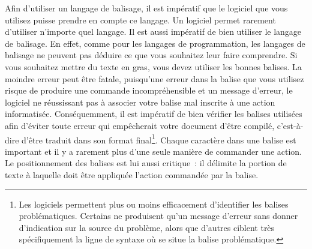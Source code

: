 \documentclass[
  letterpaper,
]{scrbook}
\begin{document}
Afin d'utiliser un langage de balisage, il est impératif que le logiciel
que vous utilisez puisse prendre en compte ce langage. Un logiciel
permet rarement d'utiliser n'importe quel langage. Il est aussi
impératif de bien utiliser le langage de balisage. En effet, comme pour
les langages de programmation, les langages de balisage ne peuvent pas
déduire ce que vous souhaitez leur faire comprendre. Si vous souhaitez
mettre du texte en gras, vous devez utiliser les bonnes balises. La
moindre erreur peut être fatale, puisqu'une erreur dans la balise que
vous utilisez risque de produire une commande incompréhensible et un
message d'erreur, le logiciel ne réussissant pas à associer votre balise
mal inscrite à une action informatisée. Conséquemment, il est impératif
de bien vérifier les balises utilisées afin d'éviter toute erreur qui
empêcherait votre document d'être compilé, c'est-à-dire d'être traduit
dans son format final\footnote{Les logiciels permettent plus ou moins
  efficacement d'identifier les balises problématiques. Certains ne
  produisent qu'un message d'erreur sans donner d'indication sur la
  source du problème, alors que d'autres ciblent très spécifiquement la
  ligne de syntaxe où se situe la balise problématique.}. Chaque
caractère dans une balise est important et il y a rarement plus d'une
seule manière de commander une action. Le positionnement des balises est
lui aussi critique~: il délimite la portion de texte à laquelle doit
être appliquée l'action commandée par la balise.

\end{document}
